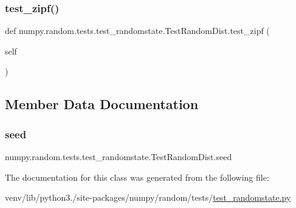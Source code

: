 \subsubsection{\texorpdfstring{test\+\_\+zipf()}{test\_zipf()}}
{\footnotesize\ttfamily def numpy.\+random.\+tests.\+test\+\_\+randomstate.\+Test\+Random\+Dist.\+test\+\_\+zipf (\begin{DoxyParamCaption}\item[{}]{self }\end{DoxyParamCaption})}



\subsection{Member Data Documentation}
\mbox{\label{classnumpy_1_1random_1_1tests_1_1test__randomstate_1_1TestRandomDist_a38e9978ab984af86b9dee8c61eeb5e42}} 
\subsubsection{\texorpdfstring{seed}{seed}}
{\footnotesize\ttfamily numpy.\+random.\+tests.\+test\+\_\+randomstate.\+Test\+Random\+Dist.\+seed}



The documentation for this class was generated from the following file\+:\begin{DoxyCompactItemize}
\item 
venv/lib/python3./site-\/packages/numpy/random/tests/\hyperlink{test__randomstate_8py}{test\+\_\+randomstate.\+py}\end{DoxyCompactItemize}
